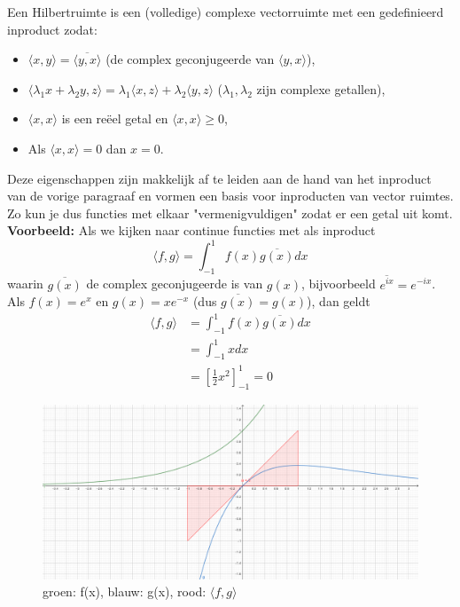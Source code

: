 \documentclass[../../main.tex]{subfiles}
\begin{document}
Een Hilbertruimte is een (volledige) complexe vectorruimte met een gedefinieerd inproduct zodat:
\begin{itemize}
    \item $\langle x,y\rangle =\overline{\langle y,x\rangle}$ (de complex geconjugeerde van $\langle y,x\rangle$),
    \item $\langle \lambda_1x+\lambda_2y,z\rangle=\lambda_1\langle x,z\rangle+\lambda_2\langle y,z\rangle$ ($\lambda_1,\lambda_2$ zijn complexe getallen),
    \item $\langle x,x\rangle$ is een reëel getal en $\langle x,x\rangle\geq 0$,
    \item Als $\langle x,x\rangle=0$ dan $x=0$.
\end{itemize}
Deze eigenschappen zijn makkelijk af te leiden aan de hand van het inproduct van de vorige paragraaf en vormen een basis voor inproducten van vector ruimtes. Zo kun je dus functies met elkaar "vermenigvuldigen" zodat er een getal uit komt.
\textbf{Voorbeeld:} Als we kijken naar continue functies met als inproduct
$$\langle f,g\rangle=\int_{-1}^1 f(x)\overline{g(x)}dx$$ waarin $\overline{g(x)}$ de complex geconjugeerde is van $g(x)$, bijvoorbeeld $\overline{e^{ix}}=e^{-ix}$.\\
Als $f(x)=e^x$ en $g(x)=xe^{-x}$ (dus $\overline{g(x)}=g(x)$), dan geldt \begin{align*}
    \langle f,g\rangle&=\int_{-1}^1 f(x)\overline{g(x)}dx\\
    &=\int_{-1}^1 x dx\\
    &=\left[\frac{1}{2}x^2\right]_{-1}^1=0
\end{align*}

\begin{figure}[h]
    \centering
    \includegraphics[width=\textwidth]{./img/inproduct functies.png}
    \caption{groen: f(x), blauw: g(x), rood: $\langle f,g\rangle$}
    \label{fig:orthofuncties}
\end{figure}
\end{document}
